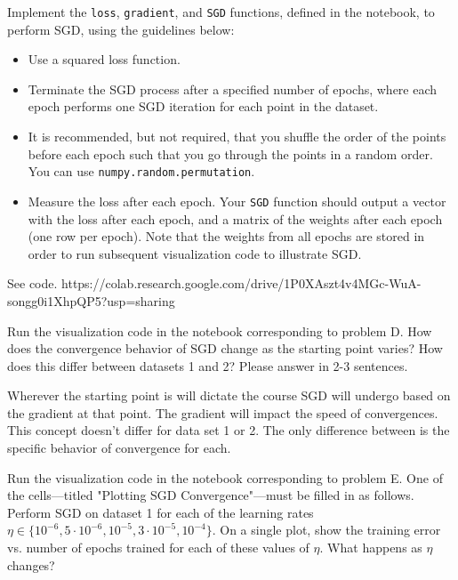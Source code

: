 \begin{problem}[6]
  Implement the \texttt{loss}, \texttt{gradient}, and \texttt{SGD} functions, defined in the notebook, to perform SGD, using the guidelines below:

  \begin{itemize}
    \item Use a squared loss function.
    \item Terminate the SGD process after a specified number of epochs, where each epoch performs one SGD iteration for each point in the dataset.
    \item It is recommended, but not required, that you shuffle the order of the points before each epoch such that you go through the points in a random order. You can use \texttt{numpy.random.permutation}.
    \item Measure the loss after each epoch. Your \texttt{SGD} function should output a vector with the loss after each epoch, and a matrix of the weights after each epoch (one row per epoch). Note that the weights from all epochs are stored in order to run subsequent visualization code to illustrate SGD.
  \end{itemize}
\end{problem}
\begin{solution}
See code. \newline %
https://colab.research.google.com/drive/1P0XAszt4v4MGc-WuA-songg0i1XhpQP5?usp=sharing
\end{solution}

\begin{problem}[2]
  Run the visualization code in the notebook corresponding to problem D. How does the convergence behavior of SGD change as the starting point varies? How does this differ between datasets 1 and 2? Please answer in 2-3 sentences.
\end{problem}
\begin{solution}
 Wherever the starting point is will dictate the course SGD will undergo based on the gradient at that point. The gradient will impact the speed of convergences. This concept doesn't differ for data set 1 or 2. The only difference between is the specific behavior of convergence for each.
\end{solution}

\begin{problem}[6]
  Run the visualization code in the notebook corresponding to problem E. One of the cells---titled "Plotting SGD Convergence"---must be filled in as follows. Perform SGD on dataset 1 for each of the learning rates $\eta \in \{10^{-6}, 5 \cdot 10^{-6}, 10^{-5}, 3 \cdot 10^{-5}, 10^{-4}\}$. On a single plot, show the training error vs. number of epochs trained for each of these values of $\eta$. What happens as $\eta$ changes?
\end{problem}

